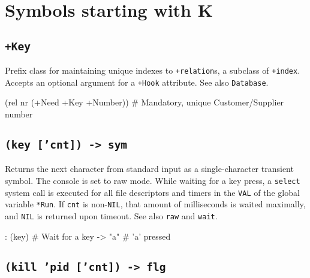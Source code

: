 %
%
%



\chapter{Symbols starting with K}
\label{cha:func-ref-K-functions-starting-with-K}
 
\section*{\texttt{+Key}}
\label{sec:func-ref-K-+Key}


Prefix class for maintaining unique indexes to \texttt{+relation}s, a
subclass of \texttt{+index}. Accepts an optional argument for a
\texttt{+Hook} attribute. See also \texttt{Database}.


\begin{wideverbatim}
(rel nr (+Need +Key +Number))  # Mandatory, unique Customer/Supplier number
\end{wideverbatim}

 
\section*{\texttt{(key ['cnt]) -> sym}}
\label{sec:func-ref-K-(key ['cnt]) -> sym}


Returns the next character from standard input as a single-character
transient symbol. The console is set to raw mode. While waiting for a
key press, a \texttt{select} system call is executed for all file descriptors
and timers in the \texttt{VAL} of the global variable \texttt{*Run}. If \texttt{cnt} is
non-\texttt{NIL}, that amount of milliseconds is waited maximally, and \texttt{NIL} is
returned upon timeout. See also \texttt{raw} and \texttt{wait}.


\begin{wideverbatim}
: (key)           # Wait for a key
-> "a"            # 'a' pressed
\end{wideverbatim}

 
\section*{\texttt{(kill 'pid ['cnt]) -> flg}}
\label{sec:func-ref-K-(kill 'pid ['cnt]) -> flg}


